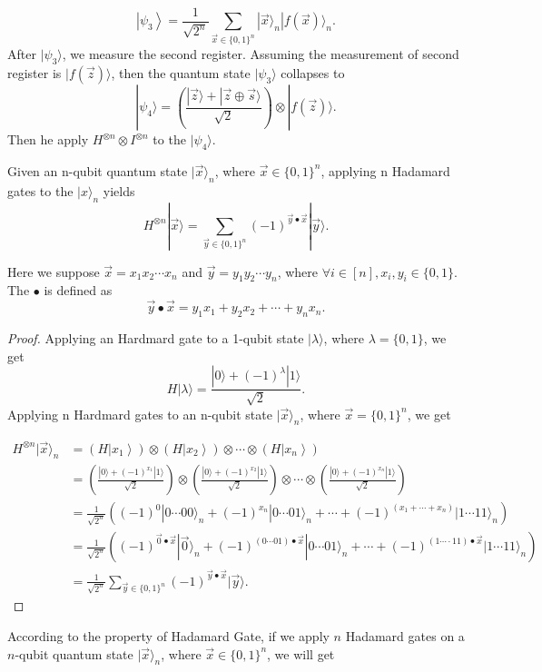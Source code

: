 $$
\left|\psi_3\right\rangle=\frac{1}{\sqrt{2^n}} \sum_{\vec{x} \in\{0,1\}^n}|\vec{x}\rangle_n|f(\vec{x})\rangle_n.
$$
After $|\psi_3\rangle$, we measure the second register. Assuming the measurement of second register is $|f(\vec{z})\rangle$, then the quantum state $|\psi_3\rangle$ collapses to
$$
|\psi_4\rangle = \left(\frac{|\vec{z}\rangle+|\vec{z} \oplus \vec{s}\rangle}{\sqrt{2}}\right) \otimes|f(\vec{z})\rangle.
$$
Then he apply $H^{\otimes n} \otimes I^{\otimes n}$ to the $|\psi_4\rangle$. 

\begin{remark}
Given an n-qubit quantum state $|\vec{x}\rangle_n$, where $\vec{x} \in \{0,1\}^n$, applying n Hadamard gates to the $|x\rangle_n$ yields 
$$
H^{\otimes n}|\vec{x}\rangle=\sum_{\vec{y} \in\{0,1\}^n}(-1)^{\vec{y} \bullet \vec{x}}|\vec{y}\rangle.
$$

Here we suppose $\vec{x} = x_1 x_2 \cdots x_n$ and $\vec{y} = y_1 y_2 \cdots y_n$, where $\forall i \in [n],x_i,y_i \in \{0,1\}$. The $\bullet$ is defined as 
$$
\vec{y} \bullet \vec{x} = y_1 x_1 + y_2 x_2 + \cdots + y_n x_n.
$$
\end{remark}

\begin{proof}
Applying an Hardmard gate to a 1-qubit state $|\lambda\rangle$, where $\lambda = \{0,1\}$, we get 
$$
H|\lambda\rangle = \frac{|0\rangle + (-1)^{\lambda}|1\rangle}{\sqrt{2}}.
$$
Applying n Hardmard gates to an n-qubit state $|\vec{x}\rangle_n$, where $\vec{x} = \{0,1\}^n$, we get 

$$
\begin{aligned}
H ^{\otimes n}|\vec{x}\rangle_n
& = \left(H\left|x_1\right\rangle\right) \otimes\left(H\left|x_2\right\rangle\right) \otimes \cdots \otimes\left(H\left|x_n\right\rangle\right) \\
& = \left(\frac{|0\rangle+(-1)^{x_1}|1\rangle}{\sqrt{2}}\right) \otimes\left(\frac{|0\rangle+(-1)^{x_2}|1\rangle}{\sqrt{2}}\right) \otimes \cdots \otimes\left(\frac{|0\rangle+(-1)^{x_n}|1\rangle}{\sqrt{2}}\right) \\
& = \frac{1}{\sqrt{2^n}}\left((-1)^{0}|0 \cdots 00\rangle_n+(-1)^{x_n}|0 \cdots 01\rangle_n+\cdots+(-1)^{\left(x_1+\cdots+x_n\right)}|1 \cdots 11\rangle_n\right) \\
& = \frac{1}{\sqrt{2^n}}\left((-1)^{\vec{0} \bullet \vec{x}}|\vec{0}\rangle_n+(-1)^{(0 \cdots 01) \bullet \vec{x}}|0 \cdots 01\rangle_n+\cdots+(-1)^{(1\cdots \cdot 11) \bullet \vec{x}}|1\cdots 11\rangle_n\right) \\
& = \frac{1}{\sqrt{2^n}}\sum_{\vec{y} \in\{0,1\}^n}(-1)^{\vec{y} \bullet \vec{x}}|\vec{y}\rangle.
\end{aligned}
$$
\end{proof}
According to the property of Hadamard Gate, if we apply $n$ Hadamard gates on a $n$-qubit quantum state $|\vec{x}\rangle_n$, where $\vec{x} \in \{0,1\}^n$, we will get

